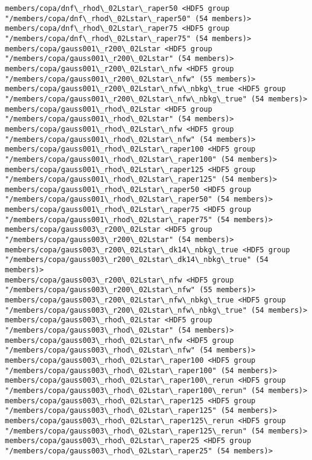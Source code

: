 \documentclass[11pt]{article}
\begin{document}
\begin{Verbatim}[commandchars=\\\{\}]
members/copa/dnf\_rhod\_02Lstar\_raper50 <HDF5 group "/members/copa/dnf\_rhod\_02Lstar\_raper50" (54 members)>
members/copa/dnf\_rhod\_02Lstar\_raper75 <HDF5 group "/members/copa/dnf\_rhod\_02Lstar\_raper75" (54 members)>
members/copa/gauss001\_r200\_02Lstar <HDF5 group "/members/copa/gauss001\_r200\_02Lstar" (54 members)>
members/copa/gauss001\_r200\_02Lstar\_nfw <HDF5 group "/members/copa/gauss001\_r200\_02Lstar\_nfw" (55 members)>
members/copa/gauss001\_r200\_02Lstar\_nfw\_nbkg\_true <HDF5 group "/members/copa/gauss001\_r200\_02Lstar\_nfw\_nbkg\_true" (54 members)>
members/copa/gauss001\_rhod\_02Lstar <HDF5 group "/members/copa/gauss001\_rhod\_02Lstar" (54 members)>
members/copa/gauss001\_rhod\_02Lstar\_nfw <HDF5 group "/members/copa/gauss001\_rhod\_02Lstar\_nfw" (54 members)>
members/copa/gauss001\_rhod\_02Lstar\_raper100 <HDF5 group "/members/copa/gauss001\_rhod\_02Lstar\_raper100" (54 members)>
members/copa/gauss001\_rhod\_02Lstar\_raper125 <HDF5 group "/members/copa/gauss001\_rhod\_02Lstar\_raper125" (54 members)>
members/copa/gauss001\_rhod\_02Lstar\_raper50 <HDF5 group "/members/copa/gauss001\_rhod\_02Lstar\_raper50" (54 members)>
members/copa/gauss001\_rhod\_02Lstar\_raper75 <HDF5 group "/members/copa/gauss001\_rhod\_02Lstar\_raper75" (54 members)>
members/copa/gauss003\_r200\_02Lstar <HDF5 group "/members/copa/gauss003\_r200\_02Lstar" (54 members)>
members/copa/gauss003\_r200\_02Lstar\_dk14\_nbkg\_true <HDF5 group "/members/copa/gauss003\_r200\_02Lstar\_dk14\_nbkg\_true" (54 members)>
members/copa/gauss003\_r200\_02Lstar\_nfw <HDF5 group "/members/copa/gauss003\_r200\_02Lstar\_nfw" (55 members)>
members/copa/gauss003\_r200\_02Lstar\_nfw\_nbkg\_true <HDF5 group "/members/copa/gauss003\_r200\_02Lstar\_nfw\_nbkg\_true" (54 members)>
members/copa/gauss003\_rhod\_02Lstar <HDF5 group "/members/copa/gauss003\_rhod\_02Lstar" (54 members)>
members/copa/gauss003\_rhod\_02Lstar\_nfw <HDF5 group "/members/copa/gauss003\_rhod\_02Lstar\_nfw" (54 members)>
members/copa/gauss003\_rhod\_02Lstar\_raper100 <HDF5 group "/members/copa/gauss003\_rhod\_02Lstar\_raper100" (54 members)>
members/copa/gauss003\_rhod\_02Lstar\_raper100\_rerun <HDF5 group "/members/copa/gauss003\_rhod\_02Lstar\_raper100\_rerun" (54 members)>
members/copa/gauss003\_rhod\_02Lstar\_raper125 <HDF5 group "/members/copa/gauss003\_rhod\_02Lstar\_raper125" (54 members)>
members/copa/gauss003\_rhod\_02Lstar\_raper125\_rerun <HDF5 group "/members/copa/gauss003\_rhod\_02Lstar\_raper125\_rerun" (54 members)>
members/copa/gauss003\_rhod\_02Lstar\_raper25 <HDF5 group "/members/copa/gauss003\_rhod\_02Lstar\_raper25" (54 members)>

\end{Verbatim}
\end{document}
